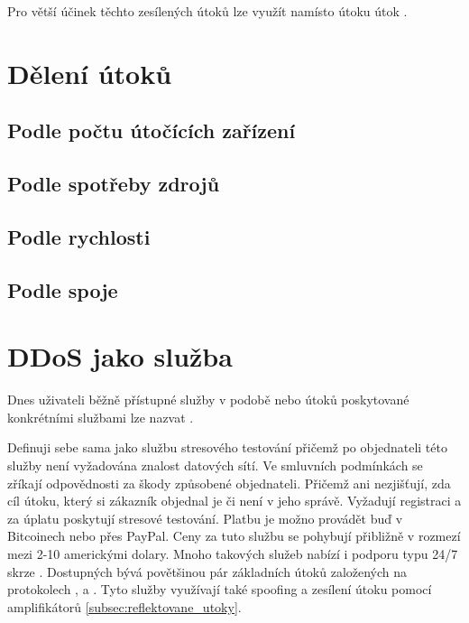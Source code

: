 Pro větší účinek těchto zesílených útoků lze využít namísto  útoku útok .

\section{Dělení útoků}
\subsection{Podle počtu útočících zařízení}

\subsection{Podle spotřeby zdrojů}

\subsection{Podle rychlosti}

\subsection{Podle spoje}

\section{DDoS jako služba}
Dnes uživateli běžně přístupné služby v podobě  nebo  útoků poskytované
konkrétními službami lze nazvat .

Definuji sebe sama jako službu stresového testování přičemž po objednateli této služby není
vyžadována znalost datových sítí. Ve smluvních podmínkách se zříkají odpovědnosti za škody
způsobené objednateli. Přičemž ani nezjišťují, zda cíl útoku, který si zákazník objednal je či
není v jeho správě. Vyžadují registraci a za úplatu poskytují stresové testování. Platbu je
možno provádět buď v Bitcoinech nebo přes PayPal. Ceny za tuto službu se pohybují přibližně v
rozmezí mezi 2-10 americkými dolary. Mnoho takových služeb nabízí i podporu typu 24/7 skrze
. Dostupných bývá povětšinou pár základních útoků založených na protokolech
,  a . Tyto služby využívají také  spoofing
a zesílení útoku pomocí amplifikátorů \ref{subsec:reflektovane_utoky}. 

